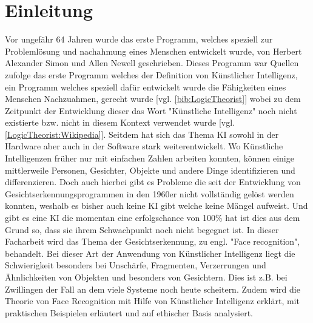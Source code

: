 \section{Einleitung}
\label{sec:einleitung}
Vor ungefähr 64 Jahren wurde das erste Programm, welches speziell zur Problemlösung und nachahmung eines Menschen entwickelt wurde, von Herbert Alexander Simon und Allen Newell geschrieben. Dieses Programm war Quellen zufolge das erste Programm welches der Definition von Künstlicher Intelligenz, ein Programm welches speziell dafür entwickelt wurde die Fähigkeiten eines Menschen Nachzuahmen, gerecht wurde [vgl. \ref{bib:LogicTheorist}] wobei zu dem Zeitpunkt der Entwicklung dieser das Wort "Künstliche Intelligenz" noch nicht existierte bzw. nicht in diesem Kontext verwendet wurde [vgl. \ref{LogicTheorist:Wikipedia}]. Seitdem hat sich das Thema KI sowohl in der Hardware aber auch in der Software stark weiterentwickelt. Wo Künstliche Intelligenzen früher nur mit einfachen Zahlen arbeiten konnten, können einige mittlerweile Personen, Gesichter, Objekte und andere Dinge identifizieren und differenzieren. Doch auch hierbei gibt es Probleme die seit der Entwicklung von Gesichtserkennungsprogrammen in den 1960er nicht vollständig gelöst werden konnten, weshalb es bisher auch keine KI gibt welche keine Mängel aufweist. Und gibt es eine KI die momentan eine erfolgschance von 100\% hat ist dies aus dem Grund so, dass sie ihrem Schwachpunkt noch nicht begegnet ist. In dieser Facharbeit wird das Thema der Gesichtserkennung, zu engl. "Face recognition", behandelt. Bei dieser Art der Anwendung von Künstlicher Intelligenz liegt die Schwierigkeit besonders bei Unschärfe, Fragmenten, Verzerrungen und Ähnlichkeiten von Objekten und besonders von Gesichtern. Dies ist z.B. bei Zwillingen der Fall an dem viele Systeme noch heute scheitern. Zudem wird die Theorie von Face Recognition mit Hilfe von Künstlicher Intelligenz erklärt, mit praktischen Beispielen erläutert und auf ethischer Basis analysiert.
